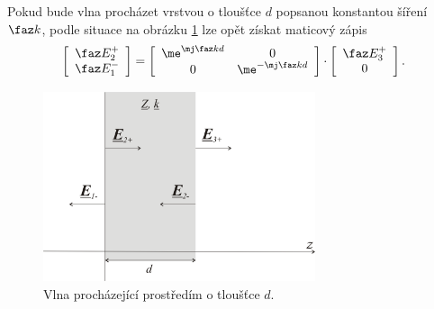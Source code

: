 Pokud bude vlna procházet vrstvou o tloušťce $d$ popsanou konstantou šíření $\faz k$, podle situace na obrázku \ref{obr:evlny_maticova_metoda2} lze opět získat maticový zápis
\begin{equation}
\left[ \begin{array}{c}
\faz E_{2}^{+} \\
\faz E_{1}^{-} \\
\end{array} \right]
=
\left[ \begin{array}{cc}
\me^{\mj\faz k d} & 0 \\
0 & \me^{-\mj\faz k d} \\
\end{array} \right]
\cdot
\left[ \begin{array}{c}
\faz E_{3}^{+} \\
0 \\
\end{array} \right].
\label{rce:evlny_maticova_pruchod}
\end{equation}
\begin{figure}[!h]
	\centering
	\includegraphics[width=8cm]{evlny_maticova_metoda2.png}
	\caption{Vlna procházející prostředím o tloušťce $d$.\cite{emp}}
	\label{obr:evlny_maticova_metoda2}
\end{figure}

